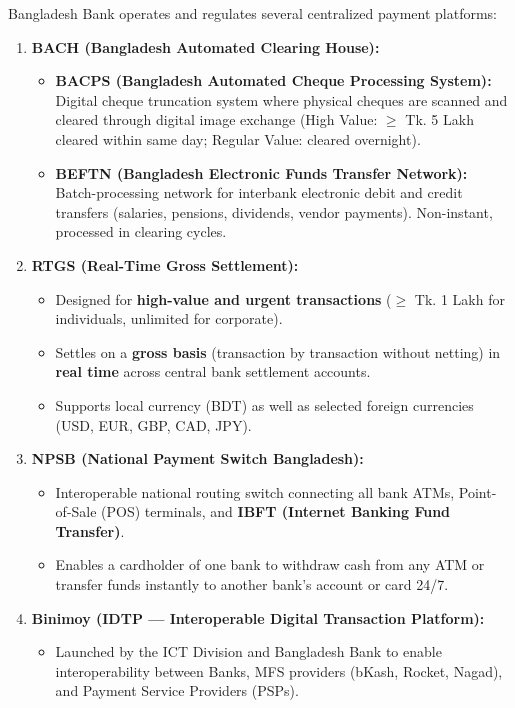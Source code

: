 Bangladesh Bank operates and regulates several centralized payment platforms:

\begin{enumerate}
  \item \textbf{BACH (Bangladesh Automated Clearing House):}
  \begin{itemize}
    \item \textbf{BACPS (Bangladesh Automated Cheque Processing System):} Digital cheque truncation system where physical cheques are scanned and cleared through digital image exchange (High Value: $\ge$ Tk. 5 Lakh cleared within same day; Regular Value: cleared overnight).
    \item \textbf{BEFTN (Bangladesh Electronic Funds Transfer Network):} Batch-processing network for interbank electronic debit and credit transfers (salaries, pensions, dividends, vendor payments). Non-instant, processed in clearing cycles.
  \end{itemize}
  \item \textbf{RTGS (Real-Time Gross Settlement):}
  \begin{itemize}
    \item Designed for \textbf{high-value and urgent transactions} ($\ge$ Tk. 1 Lakh for individuals, unlimited for corporate).
    \item Settles on a \textbf{gross basis} (transaction by transaction without netting) in \textbf{real time} across central bank settlement accounts.
    \item Supports local currency (BDT) as well as selected foreign currencies (USD, EUR, GBP, CAD, JPY).
  \end{itemize}
  \item \textbf{NPSB (National Payment Switch Bangladesh):}
  \begin{itemize}
    \item Interoperable national routing switch connecting all bank ATMs, Point-of-Sale (POS) terminals, and \textbf{IBFT (Internet Banking Fund Transfer)}.
    \item Enables a cardholder of one bank to withdraw cash from any ATM or transfer funds instantly to another bank's account or card 24/7.
  \end{itemize}
  \item \textbf{Binimoy (IDTP --- Interoperable Digital Transaction Platform):}
  \begin{itemize}
    \item Launched by the ICT Division and Bangladesh Bank to enable interoperability between Banks, MFS providers (bKash, Rocket, Nagad), and Payment Service Providers (PSPs).

\end{itemize}
\end{enumerate}

